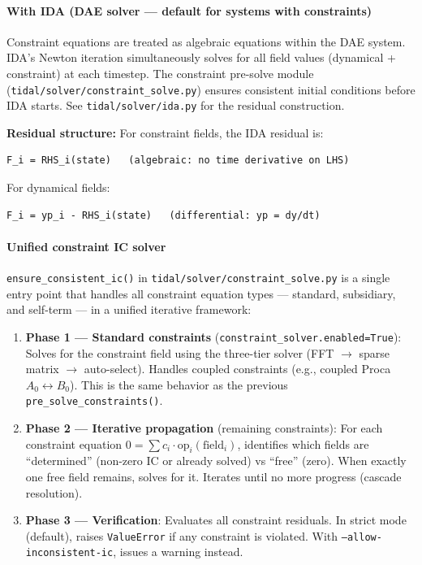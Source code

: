 \paragraph{With IDA (DAE solver --- default for systems with constraints)}
\label{sec:cf-ida}

Constraint equations are treated as algebraic equations within the DAE
system. IDA's Newton iteration simultaneously solves for all field values
(dynamical + constraint) at each timestep. The constraint pre-solve module
(\texttt{tidal/solver/constraint\_solve.py}) ensures consistent initial conditions
before IDA starts. See \texttt{tidal/solver/ida.py} for the residual construction.

\textbf{Residual structure:} For constraint fields, the IDA residual is:
\begin{lstlisting}
F_i = RHS_i(state)   (algebraic: no time derivative on LHS)
\end{lstlisting}
For dynamical fields:
\begin{lstlisting}
F_i = yp_i - RHS_i(state)   (differential: yp = dy/dt)
\end{lstlisting}

\paragraph{Unified constraint IC solver}
\label{sec:cf-unified-ic}

\texttt{ensure\_consistent\_ic()} in \texttt{tidal/solver/constraint\_solve.py} is a single entry point that handles
all constraint equation types --- standard, subsidiary, and self-term --- in
a unified iterative framework:

\begin{enumerate}
  \item \textbf{Phase 1 --- Standard constraints} (\texttt{constraint\_solver.enabled=True}):
    Solves for the constraint field using the three-tier solver (FFT $\to$ sparse
    matrix $\to$ auto-select). Handles coupled constraints (e.g., coupled Proca
    $A_0 \leftrightarrow B_0$). This is the same behavior as the previous \texttt{pre\_solve\_constraints()}.

  \item \textbf{Phase 2 --- Iterative propagation} (remaining constraints):
    For each constraint equation $0 = \sum c_i \cdot \mathrm{op}_i(\text{field}_i)$, identifies
    which fields are ``determined'' (non-zero IC or already solved) vs ``free''
    (zero). When exactly one free field remains, solves for it. Iterates until
    no more progress (cascade resolution).

  \item \textbf{Phase 3 --- Verification}: Evaluates all constraint residuals. In strict
    mode (default), raises \texttt{ValueError} if any constraint is violated. With
    \texttt{--allow-inconsistent-ic}, issues a warning instead.
\end{enumerate}

